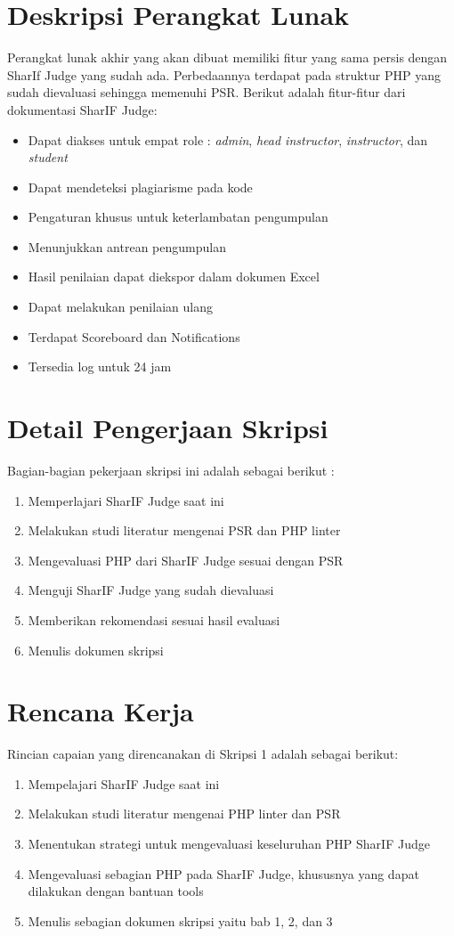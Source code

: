 \documentclass[a4paper,twoside]{article}
\begin{document}
\section{Deskripsi Perangkat Lunak}
Perangkat lunak akhir yang akan dibuat memiliki fitur yang sama persis dengan SharIf Judge yang sudah ada. Perbedaannya terdapat pada struktur PHP yang sudah dievaluasi sehingga memenuhi PSR. Berikut adalah fitur-fitur dari dokumentasi SharIF Judge:
\begin{itemize}
	\item Dapat diakses untuk empat role : \textit{admin}, \textit{head instructor}, \textit{instructor}, dan \textit{student}
	\item Dapat mendeteksi plagiarisme pada kode
	\item Pengaturan khusus untuk keterlambatan pengumpulan
	\item Menunjukkan antrean pengumpulan
	\item Hasil penilaian dapat diekspor dalam dokumen Excel
	\item Dapat melakukan penilaian ulang
	\item Terdapat Scoreboard dan Notifications
	\item Tersedia log untuk 24 jam 
\end{itemize}

\section{Detail Pengerjaan Skripsi}
Bagian-bagian pekerjaan skripsi ini adalah sebagai berikut :
	\begin{enumerate}
		\item Memperlajari SharIF Judge saat ini
		\item Melakukan studi literatur mengenai PSR dan PHP linter
		\item Mengevaluasi PHP dari SharIF Judge sesuai dengan PSR
		\item Menguji SharIF Judge yang sudah dievaluasi
		\item Memberikan rekomendasi sesuai hasil evaluasi
		\item Menulis dokumen skripsi
	\end{enumerate}

\section{Rencana Kerja}
Rincian capaian yang direncanakan di Skripsi 1 adalah sebagai berikut:
\begin{enumerate}
\item Mempelajari SharIF Judge saat ini
\item Melakukan studi literatur mengenai PHP linter dan PSR
\item Menentukan strategi untuk mengevaluasi keseluruhan PHP SharIF Judge
\item Mengevaluasi sebagian PHP pada SharIF Judge, khususnya yang dapat dilakukan dengan bantuan tools
\item Menulis sebagian dokumen skripsi yaitu bab 1, 2, dan 3
\end{enumerate}
\end{document}
